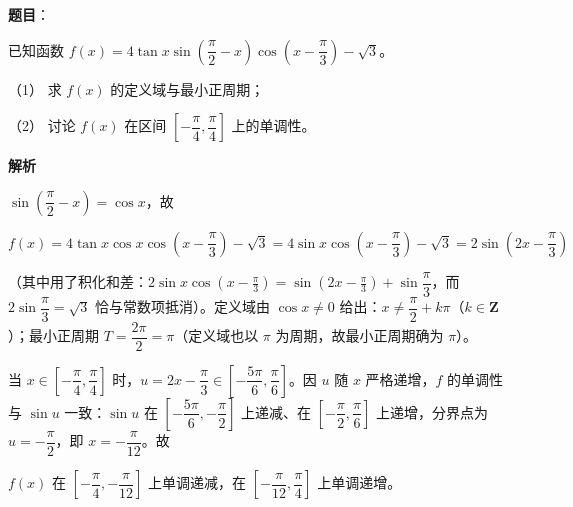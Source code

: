 \begin{answer}

\textbf{题目}：

已知函数 \(f(x)=4\tan x\sin\left(\dfrac{\pi}{2}-x\right)\cos\left(x-\dfrac{\pi}{3}\right)-\sqrt{3}\)。

（1） 求 \(f(x)\) 的定义域与最小正周期；

（2） 讨论 \(f(x)\) 在区间 \(\left[-\dfrac{\pi}{4},\dfrac{\pi}{4}\right]\) 上的单调性。

\textbf{解析}


\(\sin\left(\dfrac{\pi}{2}-x\right)=\cos x\)，故

\nopagebreak[4]
\[
f(x)=4\tan x\cos x\cos\left(x-\frac{\pi}{3}\right)-\sqrt{3}=4\sin x\cos\left(x-\frac{\pi}{3}\right)-\sqrt{3}=2\sin\left(2x-\frac{\pi}{3}\right)
\]

（其中用了积化和差：\(2\sin x\cos\left(x-\frac{\pi}{3}\right)=\sin\left(2x-\frac{\pi}{3}\right)+\sin\dfrac{\pi}{3}\)，而 \(2\sin\dfrac{\pi}{3}=\sqrt{3}\) 恰与常数项抵消）。定义域由 \(\cos x\neq0\) 给出：\(x\neq\dfrac{\pi}{2}+k\pi\)（\(k\in\mathbf{Z}\)）；最小正周期 \(T=\dfrac{2\pi}{2}=\pi\)（定义域也以 \(\pi\) 为周期，故最小正周期确为 \(\pi\)）。


当 \(x\in\left[-\dfrac{\pi}{4},\dfrac{\pi}{4}\right]\) 时，\(u=2x-\dfrac{\pi}{3}\in\left[-\dfrac{5\pi}{6},\dfrac{\pi}{6}\right]\)。因 \(u\) 随 \(x\) 严格递增，\(f\) 的单调性与 \(\sin u\) 一致：\(\sin u\) 在 \(\left[-\dfrac{5\pi}{6},-\dfrac{\pi}{2}\right]\) 上递减、在 \(\left[-\dfrac{\pi}{2},\dfrac{\pi}{6}\right]\) 上递增，分界点为 \(u=-\dfrac{\pi}{2}\)，即 \(x=-\dfrac{\pi}{12}\)。故

\(f(x)\) 在 \(\left[-\dfrac{\pi}{4},-\dfrac{\pi}{12}\right]\) 上单调递减，在 \(\left[-\dfrac{\pi}{12},\dfrac{\pi}{4}\right]\) 上单调递增。



\end{answer}

